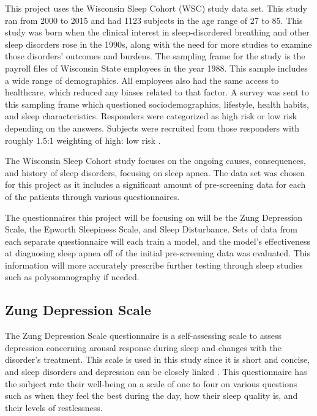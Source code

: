 \documentclass[10pt,conference,a4paper]{IEEEtran}
\begin{document}
This project uses the Wisconsin Sleep Cohort (WSC) study data set. This study ran from 2000 to 2015 and had 1123 subjects in the age range of 27 to 85. This study was born when the clinical interest in sleep-disordered breathing and other sleep disorders rose in the 1990s, along with the need for more studies to examine those disorders’ outcomes and burdens. The sampling frame for the study is the payroll files of Wisconsin State employees in the year 1988. This sample includes a wide range of demographics. All employees also had the same access to healthcare, which reduced any biases related to that factor. A survey was sent to this sampling frame which questioned sociodemographics, lifestyle, health habits, and sleep characteristics. Responders were categorized as high risk or low risk depending on the answers. Subjects were recruited from those responders with roughly 1.5:1 weighting of high: low risk \cite{2Young2009}. \par
The Wisconsin Sleep Cohort study focuses on the ongoing causes, consequences, and history of sleep disorders, focusing on sleep apnea. The data set was chosen for this project as it includes a significant amount of pre-screening data for each of the patients through various questionnaires. \par
The questionnaires this project will be focusing on will be the Zung Depression Scale, the Epworth Sleepiness Scale, and Sleep Disturbance. Sets of data from each separate questionnaire will each train a model, and the model’s effectiveness at diagnosing sleep apnea off of the initial pre-screening data was evaluated. This information will more accurately prescribe further testing through sleep studies such as polysomnography if needed. \par


\subsection{Zung Depression Scale}
\label{zung}

The Zung Depression Scale questionnaire is a self-assessing scale to assess depression concerning arousal response during sleep and changes with the disorder’s treatment. This scale is used in this study since it is short and concise, and sleep disorders and depression can be closely linked \cite{Zung1965}. This questionnaire has the subject rate their well-being on a scale of one to four on various questions such as when they feel the best during the day, how their sleep quality is, and their levels of restlessness.
\end{document}
